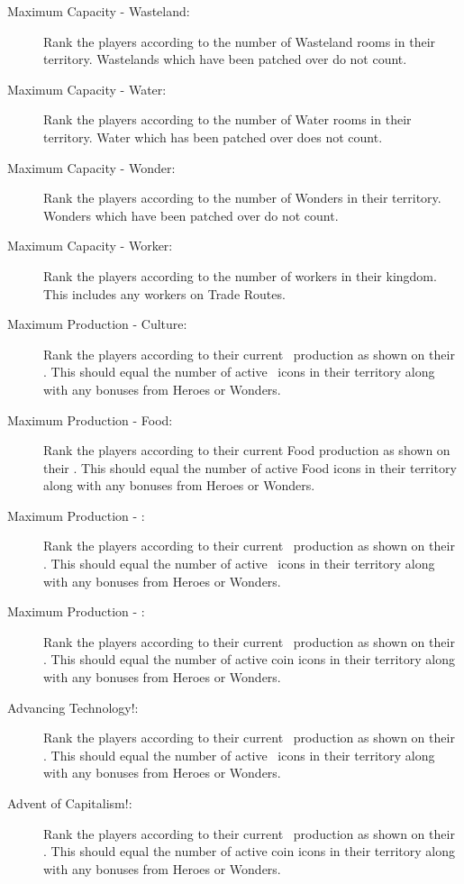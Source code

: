 \documentclass[10pt,twocolumn]{article}
\begin{document}
{\begin{description}
\item[Maximum Capacity - Wasteland:] Rank the players according to the number of Wasteland rooms in their territory. Wastelands which have been patched over do not count.
\item[Maximum Capacity - Water:] Rank the players according to the number of Water rooms in their territory. Water which has been patched over does not count.
\item[Maximum Capacity - Wonder:] Rank the players according to the number of Wonders in their territory. Wonders which have been patched over do not count.
\item[Maximum Capacity - Worker:] Rank the players according to the number of workers in their kingdom. This includes any workers on Trade Routes.
\item[Maximum Production - Culture:] Rank the players according to their current \victorypoint\ production as shown on their \psb. This should equal the number of active \victorypoint\ icons in their territory along with any bonuses from Heroes or Wonders.
\item[Maximum Production - Food:] Rank the players according to their current Food production as shown on their \psb. This should equal the number of active Food icons in their territory along with any bonuses from Heroes or Wonders.
\item[Maximum Production - \mineral:] Rank the players according to their current \mineral\ production as shown on their \psb. This should equal the number of active \mineral\ icons in their territory along with any bonuses from Heroes or Wonders.
\item[Maximum Production - \money:] Rank the players according to their current \money\ production as shown on their \psb. This should equal the number of active coin icons in their territory along with any bonuses from Heroes or Wonders.
\end{description}
}{
\begin{description}
\item[Advancing Technology!:] Rank the players according to their current \mineral\ production as shown on their \psb. This should equal the number of active \mineral\ icons in their territory along with any bonuses from Heroes or Wonders.
\item[Advent of Capitalism!:] Rank the players according to their current \money\ production as shown on their \psb. This should equal the number of active coin icons in their territory along with any bonuses from Heroes or Wonders.

\end{description}}
\end{document}
